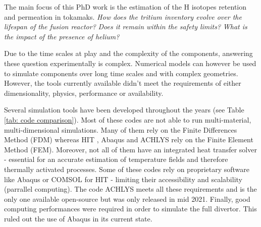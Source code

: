 The main focus of this PhD work is the estimation of the H isotopes retention and permeation in tokamaks.
\textit{How does the tritium inventory evolve over the lifespan of the fusion reactor?}
\textit{Does it remain within the safety limits?}
\textit{What is the impact of the presence of helium?}

Due to the time scales at play and the complexity of the components, answering these question experimentally is complex.
Numerical models can however be used to simulate components over long time scales and with complex geometries.
However, the tools currently available didn't meet the requirements of either dimensionality, physics, performance or availability.

Several simulation tools have been developed throughout the years (see Table \ref{tab: code comparison}).
Most of these codes are not able to run multi-material, multi-dimensional simulations.
Many of them rely on the Finite Differences Method (FDM) whereas HIT , Abaqus  and ACHLYS  rely on the Finite Element Method (FEM).
Moreover, not all of them have an integrated heat transfer solver - essential for an accurate estimation of temperature fields and therefore thermally activated processes.
Some of these codes rely on proprietary software like Abaqus or COMSOL for HIT - limiting their accessibility and scalability (parrallel computing).
The code ACHLYS meets all these requirements and is the only one available open-source but was only released in mid 2021.
Finally, good computing performances were required in order to simulate the full divertor.
This ruled out the use of Abaqus in its current state.

